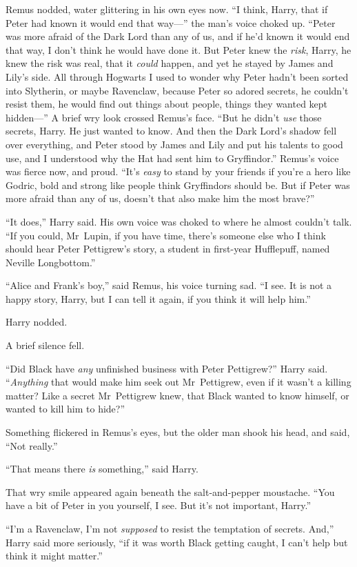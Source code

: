 Remus nodded, water glittering in his own eyes now. “I think, Harry, that if Peter had known it would end that way—” the man’s voice choked up. “Peter was more afraid of the Dark Lord than any of us, and if he’d known it would end that way, I don’t think he would have done it. But Peter knew the \emph{risk}, Harry, he knew the risk was real, that it \emph{could} happen, and yet he stayed by James and Lily’s side. All through Hogwarts I used to wonder why Peter hadn’t been sorted into Slytherin, or maybe Ravenclaw, because Peter so adored secrets, he couldn’t resist them, he would find out things about people, things they wanted kept hidden—” A brief wry look crossed Remus’s face. “But he didn’t \emph{use} those secrets, Harry. He just wanted to know. And then the Dark Lord’s shadow fell over everything, and Peter stood by James and Lily and put his talents to good use, and I understood why the Hat had sent him to Gryffindor.” Remus’s voice was fierce now, and proud. “It’s \emph{easy} to stand by your friends if you’re a hero like Godric, bold and strong like people think Gryffindors should be. But if Peter was more afraid than any of us, doesn’t that also make him the most brave?”

“It does,” Harry said. His own voice was choked to where he almost couldn’t talk. “If you could, Mr~Lupin, if you have time, there’s someone else who I think should hear Peter Pettigrew’s story, a student in first-year Hufflepuff, named Neville Longbottom.”

“Alice and Frank’s boy,” said Remus, his voice turning sad. “I see. It is not a happy story, Harry, but I can tell it again, if you think it will help him.”

Harry nodded.

A brief silence fell.

“Did Black have \emph{any} unfinished business with Peter Pettigrew?” Harry said. “\emph{Anything} that would make him seek out Mr~Pettigrew, even if it wasn’t a killing matter? Like a secret Mr~Pettigrew knew, that Black wanted to know himself, or wanted to kill him to hide?”

Something flickered in Remus’s eyes, but the older man shook his head, and said, “Not really.”

“That means there \emph{is} something,” said Harry.

That wry smile appeared again beneath the salt-and-pepper moustache. “You have a bit of Peter in you yourself, I see. But it’s not important, Harry.”

“I’m a Ravenclaw, I’m not \emph{supposed} to resist the temptation of secrets. And,” Harry said more seriously, “if it was worth Black getting caught, I can’t help but think it might matter.”

